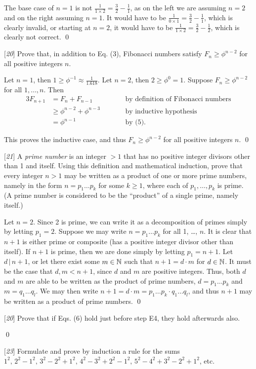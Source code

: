 \sol The base case of $n=1$ is not $\frac{1}{1\times 2} = \frac{3}{2} - \frac{1}{1}$, as on the left we are assuming $n=2$ and on the right assuming $n=1$. It would have to be $\frac{1}{0\times 1} = \frac{3}{2} - \frac{1}{1}$, which is clearly invalid, or starting at $n=2$, it would have to be $\frac{1}{1 \times 2} = \frac{3}{2} - \frac{1}{2}$, which is clearly not correct. \qed

 [\textit{20}] Prove that, in addition to Eq. (3), Fibonacci numbers satisfy $F_n \geq \phi^{n-2}$ for all positive integers $n$.

\pf Let $n = 1$, then $1 \geq \phi^{-1} \approx \frac{1}{1.618}$. Let $n=2$, then $2 \geq \phi^{0} = 1$. Suppose $F_n \geq \phi^{n-2}$ for all $1, \dots, n$. Then 
\begin{alignat*}{3}
    F_{n+1} &= F_{n} + F_{n-1} &&\text{by definition of Fibonacci numbers}\\
    &\geq \phi^{n-2} + \phi^{n-3} \qquad &&\text{by inductive hypothesis}\\
    &= \phi^{n-1} \qquad &&\text{by (5).}
\end{alignat*}

This proves the inductive case, and thus $F_n \geq \phi^{n-2}$ for all positive integers $n$. \qed

 [\textit{21}] A \textit{prime number} is an integer $> 1$ that has no positive integer divisors other than 1 and itself. Using this definition and mathematical induction, prove that every integer $n>1$ may be written as a product of one or more prime numbers, namely in the form $n = p_1 \dots p_k$ for some $k \geq 1$, where each of $p_1, \dots, p_k$ is prime. (A prime number is considered to be the ``product'' of a single prime, namely itself.)

\pf Let $n=2$. Since 2 is prime, we can write it as a decomposition of primes simply by letting $p_1 = 2$. Suppose we may write $n = p_1 \dots p_k$ for all 1, \dots, $n$. It is clear that $n+1$ is either prime or composite (has a positive integer divisor other than itself). If $n+1$ is prime, then we are done simply by letting $p_1 = n+1$. Let $d \, | \, n+1$, or let there exist some $m \in \mathbb{N}$ such that $n+1 = d\cdot m$ for $d \in \mathbb{N}$. It must be the case that $d, m < n+1$, since $d$ and $m$ are positive integers. Thus, both $d$ and $m$ are able to be written as the product of prime numbers, $d = p_1 \dots p_k$ and $m = q_1 \dots q_l$. We may then write $n+1 = d\cdot m = p_1 \dots p_k \cdot q_1 \dots q_l$, and thus $n+1$ may be written as a product of prime numbers. \qed

 [\textit{20}] Prove that if Eqs. (6) hold just before step E4, they hold afterwards also.

\pf \qed

 [\textit{23}] Formulate and prove by induction a rule for the sums $1^2, \, 2^2 - 1^2, \, 3^2 - 2^2 + 1^2, \, 4^2 - 3^2 + 2^2 - 1^2, \, 5^2 - 4^2 + 3^2 - 2^2 + 1^2$, etc.